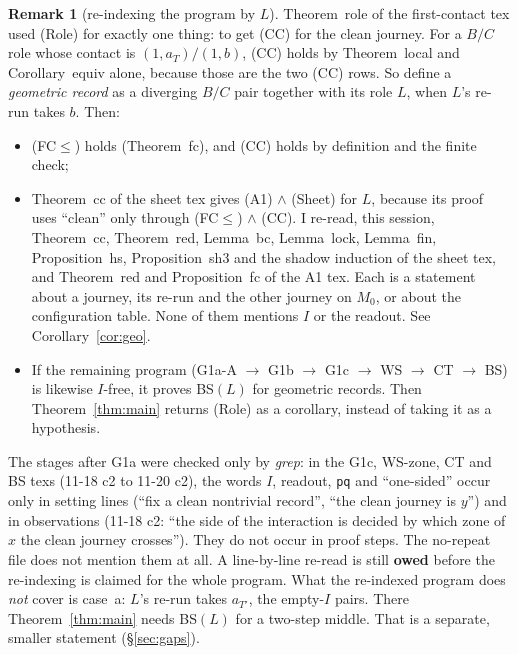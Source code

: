 \documentclass[11pt]{article}
\theoremstyle{definition}\newtheorem{definition}[theorem]{Definition}\newtheorem{remark}[theorem]{Remark}
\begin{document}
\begin{remark}[re-indexing the program by $L$]\label{rem:reindex}
Theorem~role of the first-contact tex used (Role) for exactly one thing: to get (CC) for the clean journey. For a $B/C$ role whose contact is $(1,a_T)/(1,b)$, (CC) holds by Theorem~local and Corollary~equiv alone, because those are the two (CC) rows. So define a \emph{geometric record} as a diverging $B/C$ pair together with its role $L$, when $L$'s re-run takes $b$. Then:
\begin{itemize}
\item (FC$\le$) holds (Theorem~fc), and (CC) holds by definition and the finite check;
\item Theorem~cc of the sheet tex gives (A1) $\wedge$ (Sheet) for $L$, because its proof uses ``clean'' only through (FC$\le$) $\wedge$ (CC). I re-read, this session, Theorem~cc, Theorem~red, Lemma~bc, Lemma~lock, Lemma~fin, Proposition~hs, Proposition~sh3 and the shadow induction of the sheet tex, and Theorem~red and Proposition~fc of the A1 tex. Each is a statement about a journey, its re-run and the other journey on $M_0$, or about the configuration table. None of them mentions $I$ or the readout. See Corollary~\ref{cor:geo}.
\item If the remaining program (G1a-A $\to$ G1b $\to$ G1c $\to$ WS $\to$ CT $\to$ BS) is likewise $I$-free, it proves BS$(L)$ for geometric records. Then Theorem~\ref{thm:main} returns (Role) as a corollary, instead of taking it as a hypothesis.
\end{itemize}
The stages after G1a were checked only by \emph{grep}: in the G1c, WS-zone, CT and BS texs (11-18 c2 to 11-20 c2), the words $I$, readout, \texttt{pq} and ``one-sided'' occur only in setting lines (``fix a clean nontrivial record'', ``the clean journey is $y$'') and in observations (11-18 c2: ``the side of the interaction is decided by which zone of $x$ the clean journey crosses''). They do not occur in proof steps. The no-repeat file does not mention them at all. A line-by-line re-read is still \textbf{owed} before the re-indexing is claimed for the whole program.
What the re-indexed program does \emph{not} cover is case~a: $L$'s re-run takes $a_{T'}$, the empty-$I$ pairs. There Theorem~\ref{thm:main} needs BS$(L)$ for a two-step middle. That is a separate, smaller statement (\S\ref{sec:gaps}).
\end{remark}
\end{document}
